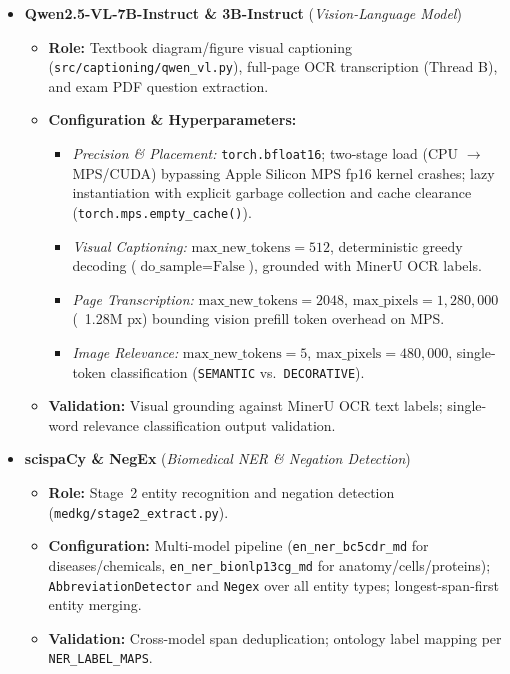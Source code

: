 {\begin{itemize}
    \item \textbf{Qwen2.5-VL-7B-Instruct \& 3B-Instruct} (\textit{Vision-Language Model})
    \begin{itemize}
        \item \textbf{Role:} Textbook diagram/figure visual captioning (\texttt{src/captioning/qwen\_vl.py}), full-page OCR transcription (Thread B), and exam PDF question extraction.
        \item \textbf{Configuration \& Hyperparameters:}
        \begin{itemize}[itemsep=1pt,topsep=1pt]
            \item \textit{Precision \& Placement:} \texttt{torch.bfloat16}; two-stage load (CPU $\to$ MPS/CUDA) bypassing Apple Silicon MPS fp16 kernel crashes; lazy instantiation with explicit garbage collection and cache clearance (\texttt{torch.mps.empty\_cache()}).
            \item \textit{Visual Captioning:} $\text{max\_new\_tokens} = 512$, deterministic greedy decoding ($\text{do\_sample} = \text{False}$), grounded with MinerU OCR labels.
            \item \textit{Page Transcription:} $\text{max\_new\_tokens} = 2048$, $\text{max\_pixels} = 1{,}280{,}000$ (~1.28M px) bounding vision prefill token overhead on MPS.
            \item \textit{Image Relevance:} $\text{max\_new\_tokens} = 5$, $\text{max\_pixels} = 480{,}000$, single-token classification (\texttt{SEMANTIC} vs.\ \texttt{DECORATIVE}).
        \end{itemize}
        \item \textbf{Validation:} Visual grounding against MinerU OCR text labels; single-word relevance classification output validation.
    \end{itemize}

    \item \textbf{scispaCy \& NegEx} (\textit{Biomedical NER \& Negation Detection})
    \begin{itemize}
        \item \textbf{Role:} Stage~2 entity recognition and negation detection (\texttt{medkg/stage2\_extract.py}).
        \item \textbf{Configuration:} Multi-model pipeline (\texttt{en\_ner\_bc5cdr\_md} for diseases/chemicals, \texttt{en\_ner\_bionlp13cg\_md} for anatomy/cells/proteins); \texttt{AbbreviationDetector} and \texttt{Negex} over all entity types; longest-span-first entity merging.
        \item \textbf{Validation:} Cross-model span deduplication; ontology label mapping per \texttt{NER\_LABEL\_MAPS}.
    \end{itemize}


\end{itemize}}
